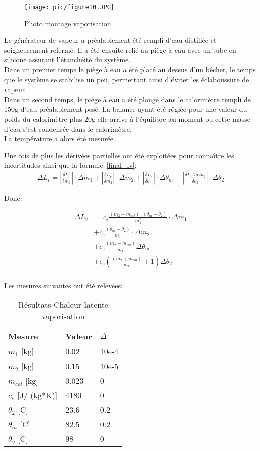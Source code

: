 \begin{figure}[!h]
    \centering
    \caption{Photo montage vaporisation}
    \texttt{[image: pic/figure10.JPG]}
\end{figure}

Le générateur de vapeur a préalablement été rempli d'eau distillée et soigneusement refermé. Il a été ensuite relié au piège à eau avec un tube en silicone assurant l'étanchéité du système.\\
Dans un premier temps le piège à eau a été placé au dessus d'un bêcher, le temps que le système se stabilise un peu, permettant ainsi d'éviter les éclaboussure de vapeur.\\
Dans un second temps, le piège à eau a été plongé dans le calorimètre rempli de 150g d'eau préalablement pesé. La balance ayant été réglée pour une valeur du poids du calorimètre plus 20g elle arrive à l'équilibre au moment ou cette masse d'eau s'est condensée dans le calorimètre.\\
La température a alors été mesurée.

Une fois de plus les dérivées partielles ont été exploitées pour connaître les incertitudes ainsi que la formule~\eqref{final_lv}:
\begin{align*}
    \Delta L_v = |\frac{\delta L_v}{\delta m_1}|\cdot \Delta m_1 + |\frac{\delta L_v}{\delta m_2}|\cdot \Delta m_2 + |\frac{\delta L_v}{\delta \theta_m}|\cdot \Delta \theta_m + |\frac{\delta L_vtheta_2}{\delta \theta_2}|\cdot \Delta \theta_2
\end{align*}

Donc:

\begin{align*}
    \Delta L_v &= c_e \frac{(m_2 + m_{cal})\cdot (\theta_m - \theta_2)}{m_1^2}\cdot \Delta m_1\\
    &+ c_e \frac{(\theta_m - \theta_2)}{m_1}\cdot \Delta m_2\\
    &+ c_e \frac{(m_2 + m_{cal})}{m_1} \Delta \theta_m\\
    &+ c_e (\frac{(m_2 + m_{cal})}{m_1} + 1)\Delta \theta_2\\
\end{align*}

Les mesures suivantes ont été relevées:

\begin{table}[!h]
    \centering
    \caption{Résultats Chaleur latente vaporisation}
    \begin{tabular}{|l|l|l|}
	\hline
	Mesure	&Valeur	&$\Delta$\\
	\hline
	$m_1$ [kg]	&0.02	&10e-4\\
	$m_2$ [kg]	&0.15	&10e-5\\
	$m_{cal}$ [kg]	&0.023	&0\\
	$c_e$ [J/ (kg*K)]	&4180	&0\\
	$\theta_2$ [C\degree]	&23.6	&0.2\\
	$\theta_m$ [C\degree]	&82.5	&0.2\\
	$\theta_v$ [C\degree]	&98	&0\\
	\hline
    \end{tabular}
\end{table}

